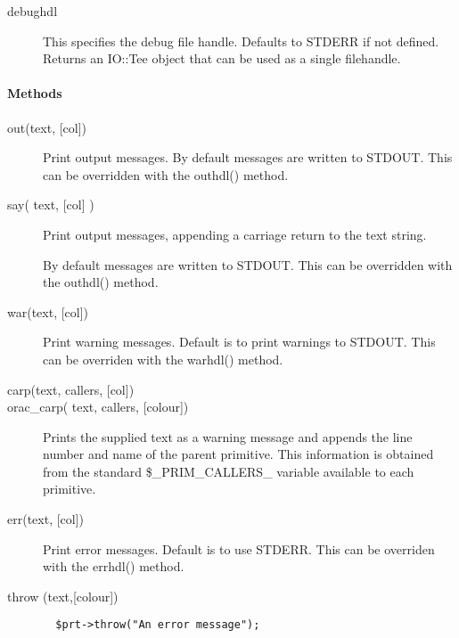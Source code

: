 \begin{description}
\begin{description}
\item[{debughdl}] \mbox{}

This specifies the debug file handle. Defaults to STDERR if not
defined. Returns an IO::Tee object that can be used as a single
filehandle.

\end{description}
\paragraph*{Methods\label{ORAC::Print_Methods}}
\begin{description}

\item[{out(text, [col])}] \mbox{}

Print output messages.
By default messages are written to STDOUT. This can be overridden with
the outhdl() method.


\item[{say( text, [col] )}] \mbox{}

Print output messages, appending a carriage return to the text string.



By default messages are written to STDOUT. This can be overridden with the outhdl() method.


\item[{war(text, [col])}] \mbox{}

Print warning messages.
Default is to print warnings to STDOUT. This can be overriden with
the warhdl() method.


\item[{carp(text, callers, [col])}] \mbox{}
\item[{orac\_carp( text, callers, [colour])}] \mbox{}

Prints the supplied text as a warning message and appends the line number
and name of the parent primitive. This information is obtained from the
standard \$\_PRIM\_CALLERS\_ variable available to each primitive.


\item[{err(text, [col])}] \mbox{}

Print error messages.
Default is to use STDERR. This can be overriden with the errhdl()
method.


\item[{throw (text,[colour])}] \mbox{}\begin{verbatim}
  $prt->throw("An error message");
\end{verbatim}



\end{description}
\end{description}
